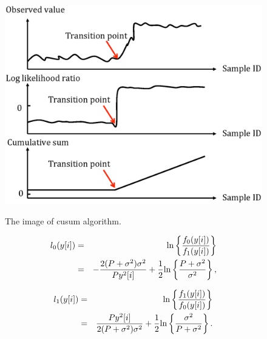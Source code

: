\begin{center}
  \begin{figure}[t]
    \centering
    \includegraphics[width=120mm]{cusum_image.eps}
    \label{cusum_image}
    \caption{The image of cusum algorithm.}
  \end{figure}
\end{center} 


\begin{eqnarray}
l_{0}(y[i]) &=& {\rm ln}\left\{\frac{f_0(y[i])}{f_1(y[i])}\right\} \label{like1} \\ 
&=& -\frac{2(P+\sigma^2)\sigma^2}{Py^2[i]} + \frac{1}{2}{\rm ln}\left\{\frac{P+\sigma^2}{\sigma^2}\right\}, \nonumber
\end{eqnarray}

\begin{eqnarray}
l_{1}(y[i]) &=& {\rm ln}\left\{\frac{f_1(y[i])}{f_0(y[i])}\right\} \label{like2} \\ 
&=& \frac{Py^2[i]}{2(P+\sigma^2)\sigma^2} + \frac{1}{2}{\rm ln}\left\{\frac{\sigma^2}{P+\sigma^2}\right\}. \nonumber
\end{eqnarray}

